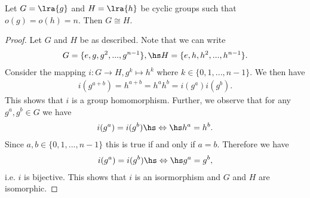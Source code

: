\documentclass{article}
\begin{document}
\begin{lemma*}
	Let $G=\lra{g}$ and $H=\lra{h}$ be cyclic groups such that
	$o(g)=o(h)=n$. Then $G\cong H$.
\end{lemma*}

\begin{proof}
	Let $G$ and $H$ be as described. Note that we can write
	\begin{align*}
		G=\{e, g, g^2, ..., g^{n-1}\},\hs
		H=\{e, h, h^2, ..., h^{n-1}\}.
	\end{align*}
	Consider the mapping $i:G\to H, g^k\mapsto h^k$ where
	$k\in\{0,1,...,n-1\}$. We then have
	\begin{align*}
		i(g^{a+b}) = h^{a+b} = h^a h^b = i(g^a)i(g^b).
	\end{align*}
	This shows that $i$ is a group homomorphism. Further, we observe
	that for any $g^a,g^b\in G$ we have
	\begin{align*}
		i(g^a) = i(g^b) \hs\Leftrightarrow\hs h^a=h^b.
	\end{align*}
	Since $a,b\in\{0,1,...,n-1\}$ this is true if and only if $a=b$.
	Therefore we have
	\begin{align*}
		i(g^a) = i(g^b) \hs\Leftrightarrow\hs g^a = g^b,
	\end{align*}
	i.e. $i$ is bijective. This shows that $i$ is an isormorphism
	and $G$ and $H$ are isomorphic.
\end{proof}
\end{document}
